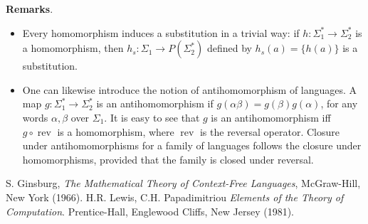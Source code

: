 \documentclass[12pt]{article}
\begin{document}
\textbf{Remarks}.  
\begin{itemize}
\item
Every homomorphism induces a substitution in a trivial way: if $h:\Sigma_1^* \to \Sigma_2^*$ is a homomorphism, then $h_s:\Sigma_1\to P(\Sigma_2^*)$ defined by $h_s(a)=\lbrace h(a) \rbrace$ is a substitution.
\item
One can likewise introduce the notion of antihomomorphism of languages.  A map $g:\Sigma_1^* \to \Sigma_2^*$ is an antihomomorphism if $g(\alpha\beta)=g(\beta)g(\alpha)$, for any words $\alpha,\beta$ over $\Sigma_1$.  It is easy to see that $g$ is an antihomomorphism iff $g\circ \operatorname{rev}$ is a homomorphism, where $\operatorname{rev}$ is the reversal operator. Closure under antihomomorphisms for a family of languages follows the closure under homomorphisms, provided that the family is closed under reversal.
\end{itemize}

\begin{thebibliography}{9}
 S. Ginsburg, {\em The Mathematical Theory of Context-Free Languages}, McGraw-Hill, New York (1966).
 H.R. Lewis, C.H. Papadimitriou {\em Elements of the Theory of Computation}. Prentice-Hall, Englewood Cliffs, New Jersey (1981).
\end{thebibliography}
\end{document}
